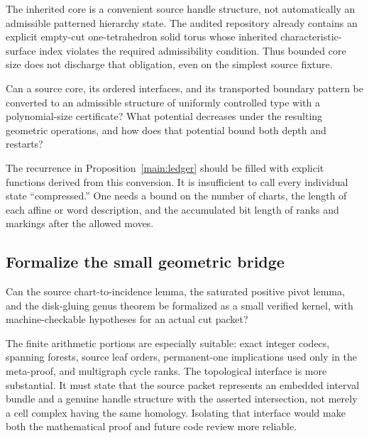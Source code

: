 The inherited core is a convenient source handle structure, not automatically
an admissible patterned hierarchy state.  The audited repository already
contains an explicit empty-cut one-tetrahedron solid torus whose inherited
characteristic-surface index violates the required admissibility condition.
Thus bounded core size does not discharge that obligation, even on the simplest
source fixture\cite{ProveIt2026}.

\begin{question}
Can a source core, its ordered interfaces, and its transported boundary pattern
be converted to an admissible structure of uniformly controlled type with a
polynomial-size certificate?  What potential decreases under the resulting
geometric operations, and how does that potential bound both depth and restarts?
\end{question}

The recurrence in Proposition~\ref{main:ledger} should be filled with explicit
functions derived from this conversion.  It is insufficient to call every
individual state ``compressed.''  One needs a bound on the number of charts,
the length of each affine or word description, and the accumulated bit length
of ranks and markings after the allowed moves.

\subsection{Formalize the small geometric bridge}

\begin{question}
Can the source chart-to-incidence lemma, the saturated positive pivot lemma,
and the disk-gluing genus theorem be formalized as a small verified kernel,
with machine-checkable hypotheses for an actual cut packet?
\end{question}

The finite arithmetic portions are especially suitable: exact integer codecs,
spanning forests, source leaf orders, permanent-one implications used only in
the meta-proof, and multigraph cycle ranks.  The topological interface is more
substantial.  It must state that the source packet represents an embedded
interval bundle and a genuine handle structure with the asserted intersection,
not merely a cell complex having the same homology.  Isolating that interface
would make both the mathematical proof and future code review more reliable.

